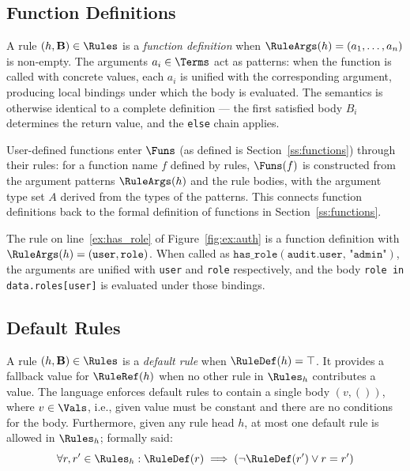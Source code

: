 \subsection{Function Definitions}
\label{ss:fun-rules}


A rule $(h, \mathbf{B}) \in \Rules$ is a \emph{function definition} when $\RuleArgs(h) = (a_1, \ldots, a_n)$
is non-empty.
The arguments $a_i \in \Terms$ act as patterns: when the function is called with concrete
values, each $a_i$ is unified with the corresponding argument, producing local bindings
under which the body is evaluated.
The semantics is otherwise identical to a complete definition — the first satisfied body
$B_i$ determines the return value, and the \texttt{else} chain applies.

User-defined functions enter $\Funs$ (as defined is Section~\ref{ss:functions}) through their rules: for a function name $f$
defined by rules, $\Funs(f)$ is constructed from the argument patterns $\RuleArgs(h)$
and the rule bodies, with the argument type set $A$ derived from the types of the patterns.
This connects function definitions back to the formal definition of functions in
Section~\ref{ss:functions}.

\begin{example}
  The rule on line~\ref{ex:has_role} of Figure~\ref{fig:ex:auth} is a function definition
  with $\RuleArgs(h) = (\texttt{user}, \texttt{role})$.
  When called as $\texttt{has\_role}(\texttt{audit.user},\, \texttt{"admin"})$,
  the arguments are unified with \texttt{user} and \texttt{role} respectively,
  and the body \texttt{role in data.roles[user]} is evaluated under those bindings.
\end{example}


\subsection{Default Rules}
\label{ss:default}


A rule $(h, \mathbf{B}) \in \Rules$ is a \emph{default rule} when $\RuleDef(h) = \top$.
It provides a fallback value for $\RuleRef(h)$ when no other rule in $\Rules_h$ contributes
a value.
The \rego language enforces default rules to contain a single body $(v,())$, where $v \in \Vals$, i.e., given value must be constant and there are no conditions for the body.
Furthermore, given any rule head $h$, at most one default rule is allowed in $\Rules_h$; formally said:
$$\forall r,r' \in \Rules_h: \RuleDef(r) \implies (\neg\RuleDef(r') \lor r = r')$$

